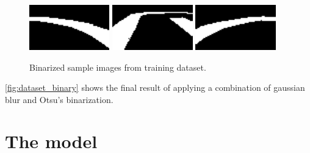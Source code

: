 \begin{figure}[h]
  \centering\includegraphics[width=0.31\textwidth]{imgs/binary_left.png}
  \includegraphics[width=0.31\textwidth]{imgs/binary_up.png}
  \includegraphics[width=0.31\textwidth]{imgs/binary_right.png}
  \caption{Binarized sample images from training dataset.\label{fig:dataset_binary}}
\end{figure}

\autoref{fig:dataset_binary} shows the final result of applying a combination of gaussian blur and
Otsu's binarization.

\section{The model}

